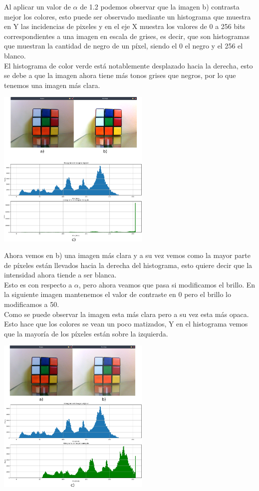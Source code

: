 Al aplicar un valor de $\alpha$ de 1.2 podemos observar que la imagen b) contrasta mejor los colores, esto puede ser observado
mediante un histograma que muestra en Y las incidencias de pixeles y en el eje X muestra los valores de 0 a 256 bits correspondientes
a una imagen en escala de grises, es decir, que son histogramas que muestran la cantidad de negro de un píxel, siendo el 0 el negro
y el 256 el blanco.\\
El histograma de color verde está notablemente desplazado hacia la derecha, esto se debe a que la imagen ahora tiene más tonos grises
que negros, por lo que tenemos una imagen más clara.
\begin{center}
	\includegraphics[width=0.55\textwidth]{Contenido/Cuerpo/Capitulo4/Fig20.eps}
	\label{Fig9}
\end{center}
Ahora vemos en b) una imagen más clara y a su vez vemos como la mayor parte de píxeles están llevados hacia la derecha del
histograma, esto quiere decir que la intensidad ahora tiende a ser blanca.\\
Esto es con respecto a $\alpha$, pero ahora veamos que pasa si modificamos el brillo. En la siguiente imagen mantenemos
el valor de contraste en 0 pero el brillo lo modificamos a 50.\\
Como se puede observar la imagen esta más clara pero a su vez esta más opaca. Esto hace que los colores se vean un poco matizados,
Y en el histograma vemos que la mayoría de los píxeles están sobre la izquierda.
\begin{center}
	\includegraphics[width=0.55\textwidth]{Contenido/Cuerpo/Capitulo4/Fig21.eps}
	\label{Fig9}
\end{center}
